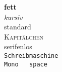 \textbf{fett} \\
\textit{kursiv} \\
\textrm{standard} \\
\textsc{Kapitälchen} \\
\textsf{serifenlos} \\
\texttt{Schreibmaschine}\\
\verb!Mono   space!\\

